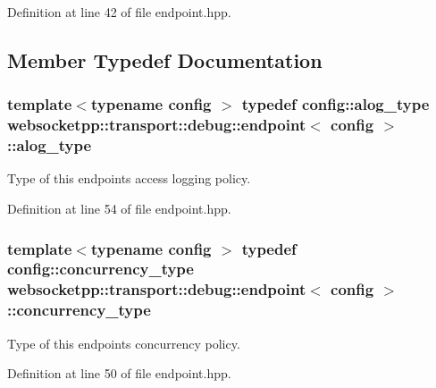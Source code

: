 Definition at line 42 of file endpoint.\+hpp.



\subsection{Member Typedef Documentation}
\hypertarget{classwebsocketpp_1_1transport_1_1debug_1_1endpoint_ab2b8a06c2ba2a9ae26def00aefcbc930}{}
\subsubsection[{alog\+\_\+type}]{\setlength{\rightskip}{0pt plus 5cm}template$<$typename config $>$ typedef config\+::alog\+\_\+type {\bf websocketpp\+::transport\+::debug\+::endpoint}$<$ config $>$\+::{\bf alog\+\_\+type}}\label{classwebsocketpp_1_1transport_1_1debug_1_1endpoint_ab2b8a06c2ba2a9ae26def00aefcbc930}


Type of this endpoint\textquotesingle{}s access logging policy. 



Definition at line 54 of file endpoint.\+hpp.

\hypertarget{classwebsocketpp_1_1transport_1_1debug_1_1endpoint_adbe41c60a84f148cbdce15a0535ac2e9}{}
\subsubsection[{concurrency\+\_\+type}]{\setlength{\rightskip}{0pt plus 5cm}template$<$typename config $>$ typedef config\+::concurrency\+\_\+type {\bf websocketpp\+::transport\+::debug\+::endpoint}$<$ config $>$\+::{\bf concurrency\+\_\+type}}\label{classwebsocketpp_1_1transport_1_1debug_1_1endpoint_adbe41c60a84f148cbdce15a0535ac2e9}


Type of this endpoint\textquotesingle{}s concurrency policy. 



Definition at line 50 of file endpoint.\+hpp.

